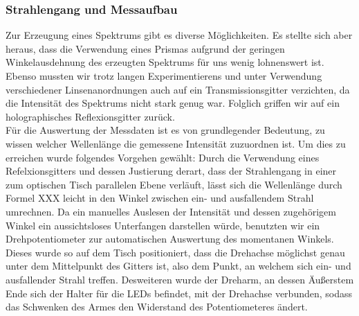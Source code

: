 \documentclass[11pt]{scrartcl}
\begin{document}
\subsubsection{Strahlengang und Messaufbau} %
Zur Erzeugung eines Spektrums gibt es diverse M\"oglichkeiten. Es stellte sich aber heraus, dass die Verwendung eines Prismas aufgrund der geringen Winkelausdehnung des erzeugten Spektrums f\"ur uns wenig lohnenswert ist. Ebenso mussten wir trotz langen Experimentierens und unter Verwendung verschiedener Linsenanordnungen auch auf ein Transmissionsgitter verzichten, da die Intensit\"at des Spektrums nicht stark genug war. Folglich griffen wir auf ein holographisches Reflexionsgitter zur\"uck.\\%
F\"ur die Auswertung der Messdaten ist es von grundlegender Bedeutung, zu wissen welcher Wellenl\"ange die gemessene Intensit\"at zuzuordnen ist. Um dies zu erreichen wurde folgendes Vorgehen gew\"ahlt: Durch die Verwendung eines Refelxionsgitters und dessen Justierung derart, dass der Strahlengang in einer zum optischen Tisch parallelen Ebene verl\"auft, l\"asst sich die Wellenl\"ange durch Formel XXX leicht in den Winkel zwischen ein- und ausfallendem Strahl umrechnen. Da ein manuelles Auslesen der Intensit\"at und dessen zugeh\"origem Winkel ein aussichtsloses Unterfangen darstellen w\"urde, benutzten wir ein Drehpotentiometer zur automatischen Auswertung des momentanen Winkels. Dieses wurde so auf dem Tisch positioniert, dass die Drehachse m\"oglichst genau unter dem Mittelpunkt des Gitters ist, also dem Punkt, an welchem sich ein- und ausfallender Strahl treffen. Desweiteren wurde der Dreharm, an dessen \"Au\ss{}erstem Ende sich der Halter f\"ur die LEDs befindet, mit der Drehachse verbunden, sodass das Schwenken des Armes den Widerstand des Potentiometeres \"andert.
\end{document}
